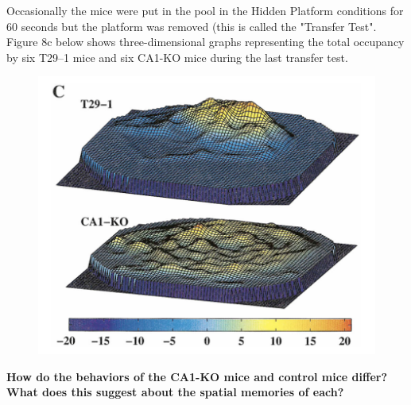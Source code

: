 \documentclass{article}
\begin{document}
\pagebreak
Occasionally the mice were put in the pool in the Hidden Platform conditions for 60 seconds but the platform was removed (this is called the "Transfer Test". Figure 8c below shows three-dimensional graphs representing the total occupancy by six T29–1 mice and six CA1-KO mice during the last transfer test. 
\FloatBarrier
\begin{figure}[h]
  \centering
    \includegraphics[width=.6\textwidth]{fig8c.png}
\end{figure}
\FloatBarrier

\noindent \textbf{How do the behaviors of the CA1-KO mice and control mice differ? What does this suggest about the spatial memories of each?}
\vspace{5cm}

\printbibliography
\end{document}
